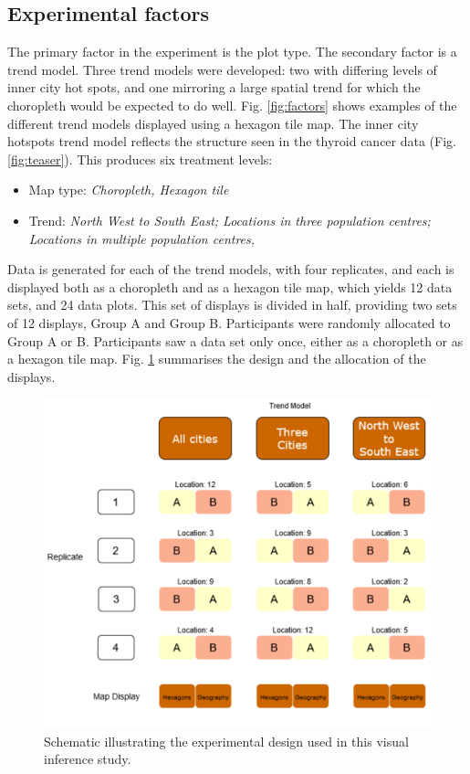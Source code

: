 \documentclass[journal]{vgtc}                     %
\begin{document}
\hypertarget{experimental-factors}{%
\subsection{Experimental factors}\label{experimental-factors}}

The primary factor in the experiment is the plot type. The secondary factor is a trend model. Three trend models were developed:  two with differing levels of inner city hot spots, and one mirroring a large spatial trend for which the choropleth would be expected to do well. Fig. \ref{fig:factors} shows examples of the different trend models displayed using a hexagon tile map.  The inner city hotspots trend model reflects the structure seen in the thyroid cancer data (Fig. \ref{fig:teaser}). This produces six treatment levels:

\begin{itemize} \itemsep 0in
\item
  Map type: \emph{Choropleth, Hexagon tile}
\item
  Trend: \emph{North West to South East; Locations in three population centres; Locations in multiple population centres, }
\end{itemize}

Data is generated for each of the trend models, with four replicates, and each is displayed both as a choropleth and as a hexagon tile map, which yields 12 data sets, and 24 data plots. This set of displays is divided in half, providing two sets of 12 displays, Group A and Group B. Participants were randomly allocated to Group A or B. Participants saw a data set only once, either as a choropleth or as a hexagon tile map. Fig. \ref{fig:exp-design} summarises the design and the allocation of the displays.

\begin{figure}[h]
\includegraphics[width=1\linewidth]{paper_files/figure-latex/exp-design-1} \caption{Schematic illustrating the experimental design used in this visual inference study.}\label{fig:exp-design}
\end{figure}
\end{document}
